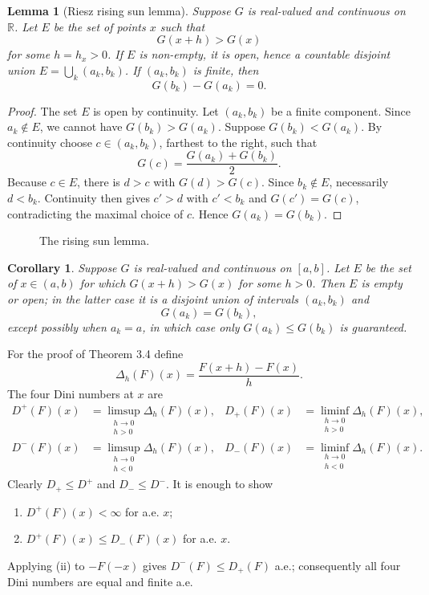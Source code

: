 \documentclass[11pt,openany]{book}
\newtheorem{lemma}[theorem]{Lemma}
\newtheorem{corollary}[theorem]{Corollary}
\begin{document}
\begin{lemma}[Riesz rising sun lemma]
Suppose $G$ is real-valued and continuous on $\mathbb R$. Let $E$ be the set of points $x$ such that
\[
G(x+h)>G(x)
\]
for some $h=h_x>0$. If $E$ is non-empty, it is open, hence a countable disjoint union $E=\bigcup_k(a_k,b_k)$. If $(a_k,b_k)$ is finite, then
\[
G(b_k)-G(a_k)=0.
\]
\end{lemma}

\begin{proof}
The set $E$ is open by continuity. Let $(a_k,b_k)$ be a finite component. Since $a_k\notin E$, we cannot have $G(b_k)>G(a_k)$. Suppose $G(b_k)<G(a_k)$. By continuity choose $c\in(a_k,b_k)$, farthest to the right, such that
\[
G(c)=\frac{G(a_k)+G(b_k)}2.
\]
Because $c\in E$, there is $d>c$ with $G(d)>G(c)$. Since $b_k\notin E$, necessarily $d<b_k$. Continuity then gives $c'>d$ with $c'<b_k$ and $G(c')=G(c)$, contradicting the maximal choice of $c$. Hence $G(a_k)=G(b_k)$.
\end{proof}

\begin{figure}[ht]
\centering
{}
\caption{The rising sun lemma.}
\end{figure}

\begin{corollary}
Suppose $G$ is real-valued and continuous on $[a,b]$. Let $E$ be the set of $x\in(a,b)$ for which $G(x+h)>G(x)$ for some $h>0$. Then $E$ is empty or open; in the latter case it is a disjoint union of intervals $(a_k,b_k)$ and
\[
G(a_k)=G(b_k),
\]
except possibly when $a_k=a$, in which case only $G(a_k)\le G(b_k)$ is guaranteed.
\end{corollary}

For the proof of Theorem 3.4 define
\[
\Delta_h(F)(x)=\frac{F(x+h)-F(x)}{h}.
\]
The four Dini numbers at $x$ are
\begin{align*}
D^+(F)(x)&=\limsup_{\substack{h\to0\\h>0}}\Delta_h(F)(x),&
D_+(F)(x)&=\liminf_{\substack{h\to0\\h>0}}\Delta_h(F)(x),\\
D^-(F)(x)&=\limsup_{\substack{h\to0\\h<0}}\Delta_h(F)(x),&
D_-(F)(x)&=\liminf_{\substack{h\to0\\h<0}}\Delta_h(F)(x).
\end{align*}
Clearly $D_+\le D^+$ and $D_-\le D^-$. It is enough to show
\begin{enumerate}
\item[(i)] $D^+(F)(x)<\infty$ for a.e. $x$;
\item[(ii)] $D^+(F)(x)\le D_-(F)(x)$ for a.e. $x$.
\end{enumerate}
Applying (ii) to $-F(-x)$ gives $D^-(F)\le D_+(F)$ a.e.; consequently all four Dini numbers are equal and finite a.e.
\end{document}
